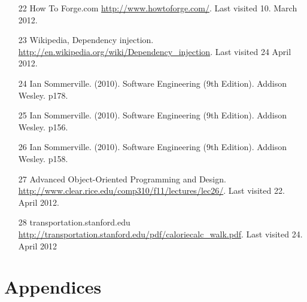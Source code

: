 \documentclass[12pt, a4paper]{report}   %
\begin{document}
\begin{enumerate}
\begin{thebibliography}{9}
\begin{itemize}
	\item [22] How To Forge.com \url{http://www.howtoforge.com/}. Last visited 10. March 2012.\\
	\item [23] Wikipedia, Dependency injection. \url{http://en.wikipedia.org/wiki/Dependency_injection}. Last visited 24 April 2012.\\
	\item [24] Ian Sommerville. (2010). Software Engineering (9th Edition). Addison Wesley. p178.\\
	\item [25] Ian Sommerville. (2010). Software Engineering (9th Edition). Addison Wesley. p156.\\
	\item [26] Ian Sommerville. (2010). Software Engineering (9th Edition). Addison Wesley. p158.\\
	\item [27] Advanced Object-Oriented Programming and Design. \url{http://www.clear.rice.edu/comp310/f11/lectures/lec26/}. Last visited 22. April 2012. \\
	\item [28] transportation.stanford.edu \url{http://transportation.stanford.edu/pdf/caloriecalc_walk.pdf}. Last visited 24. April 2012
	

\end{itemize}


\end{thebibliography}

\chapter*{Appendices}


\end{enumerate}
\end{document}
